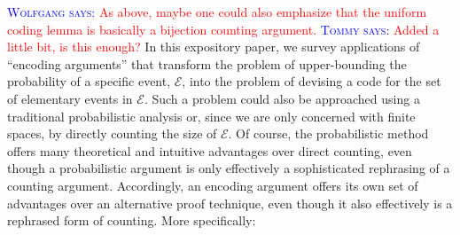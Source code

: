 \documentclass{patmorin}
\newcommand{\aremark}[3]{\textcolor{blue}{\textsc{#1 #2:}}
  \textcolor{red}{\textsf{#3}}}
\newcommand{\tommy}[2][says]{\aremark{Tommy}{#1}{#2}}
\newcommand{\wolfgang}[2][says]{\aremark{Wolfgang}{#1}{#2}}
\begin{document}
\wolfgang{As above, maybe one could also emphasize that the uniform
  coding lemma is basically a bijection counting argument.}
\tommy{Added a little bit, is this enough?} In this expository paper,
we survey applications of ``encoding arguments'' that transform the
problem of upper-bounding the probability of a specific event,
$\mathcal{E}$, into the problem of devising a code for the set of
elementary events in $\mathcal{E}$. Such a problem could also be
approached using a traditional probabilistic analysis or, since we are
only concerned with finite spaces, by directly counting the size of
$\mathcal{E}$. Of course, the probabilistic method offers many
theoretical and intuitive advantages over direct counting, even though
a probabilistic argument is only effectively a sophisticated
rephrasing of a counting argument. Accordingly, an encoding argument
offers its own set of advantages over an alternative proof technique,
even though it also effectively is a rephrased form of counting. More
specifically:
\end{document}
